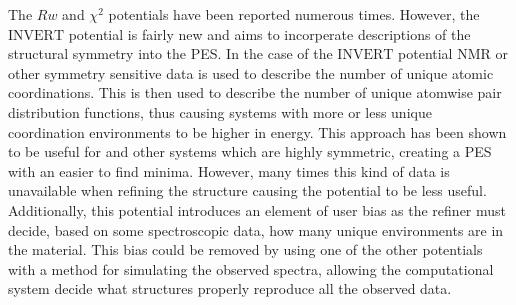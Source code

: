 The $Rw$ and $\chi^{2}$ potentials have been reported numerous times. \cite{ALL THE THINGS}
However, the $\mathrm{INVERT}$ potential is fairly new and aims to incorperate descriptions of the structural symmetry into the PES. \cite{Cliffe2010, Cliffe2013}
In the case of the $\mathrm{INVERT}$ potential NMR or other symmetry sensitive data is used to describe the number of unique atomic coordinations.
This is then used to describe the number of unique atomwise pair distribution functions, thus causing systems with more or less unique coordination environments to be higher in energy.
This approach has been shown to be useful for  and other systems which are highly symmetric, creating a PES with an easier to find minima. \cite{Cliffe2010, Cliffe2013}
However, many times this kind of data is unavailable when refining the structure causing the potential to be less useful.
Additionally, this potential introduces an element of user bias as the refiner must decide, based on some spectroscopic data, how many unique environments are in the material.
This bias could be removed by using one of the other potentials with a method for simulating the observed spectra, allowing the computational system decide what structures properly reproduce all the observed data.


